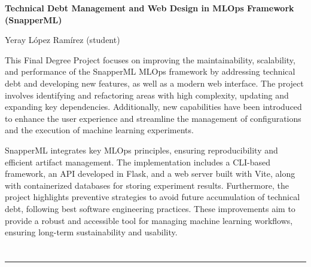 \thispagestyle{empty}


\begin{center}
       {\large\bfseries Technical Debt Management and Web Design in MLOps Framework (SnapperML)}\\
\end{center}
\begin{center}
       Yeray López Ramírez (student)\\
\end{center}


\vspace{1.2cm}


\vspace{0.5cm}
This Final Degree Project focuses on improving the maintainability, scalability, and performance of the SnapperML MLOps framework by addressing technical debt and developing new features, as well as a modern web interface. The project involves identifying and refactoring areas with high complexity, updating and expanding key dependencies. Additionally, new capabilities have been introduced to enhance the user experience and streamline the management of configurations and the execution of machine learning experiments.

\vspace{2.5mm}

SnapperML integrates key MLOps principles, ensuring reproducibility and efficient artifact management. The implementation includes a CLI-based framework, an API developed in Flask, and a web server built with Vite, along with containerized databases for storing experiment results. Furthermore, the project highlights preventive strategies to avoid future accumulation of technical debt, following best software engineering practices. These improvements aim to provide a robust and accessible tool for managing machine learning workflows, ensuring long-term sustainability and usability.

\chapter*{}
\thispagestyle{empty}

\noindent\rule[-1ex]{\textwidth}{2pt}

